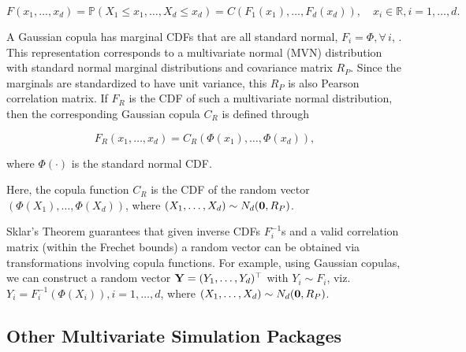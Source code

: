 \documentclass[
]{jss}
\begin{document}
\begin{equation}
F(x_1, \ldots, x_d) = {\mathbb P}(X_1\leq x_1, \ldots,X_d\leq x_d) = C(F_1(x_1), \ldots, F_d(x_d)), \quad x_i \in {\mathbb R}, i=1,\ldots,d.
\label{eq:copula}
\end{equation}

A Gaussian copula has marginal CDFs that are all standard normal, \(F_i = \Phi, \forall \, i\), . This representation corresponds to a multivariate normal (MVN) distribution with standard normal marginal distributions and covariance matrix \(R_P\). Since the marginals are standardized to have unit variance, this \(R_P\) is also Pearson correlation matrix. If \(F_R\) is the CDF of such a multivariate normal distribution, then the corresponding Gaussian copula \(C_R\) is defined through

\begin{equation}
\label{eq:gauss}
F_R(x_1, \ldots, x_d) = C_R(\Phi(x_1), \ldots, \Phi(x_d)),
\end{equation}

where \(\Phi(\cdot)\) is the standard normal CDF.

Here, the copula function \(C_R\) is the CDF of the random vector \((\Phi(X_1), \ldots, \Phi(X_d))\), where \((X_1, \ldots, X_d) \sim N_d({\bf 0}, R_P)\).

Sklar's Theorem \citep{Ubeda-Flores2017} guarantees that given inverse CDFs \(F_i^{-1}\)s and a valid correlation matrix (within the Frechet bounds) a random vector can be obtained via transformations involving copula functions. For example, using Gaussian copulas, we can construct a random vector \({\bf Y} = (Y_1, \ldots, Y_d)^\top\) with \(Y_i \sim F_i\), viz. \(Y_i = F_i^{-1}(\Phi(X_i)), i=1, \ldots, d\), where \((X_1, \ldots, X_d) \sim N_d({\bf 0}, R_P)\).

\hypertarget{other-multivariate-simulation-packages}{%
\subsection{Other Multivariate Simulation Packages}\label{other-multivariate-simulation-packages}}
\end{document}
